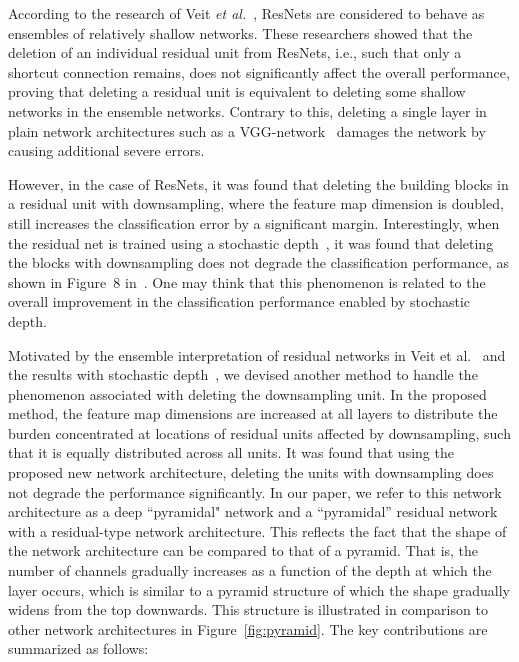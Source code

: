 \documentclass[10pt,twocolumn,letterpaper]{article}
\begin{document}
According to the research of Veit {\it et al.}~\cite{ensemble}, ResNets are considered to behave as ensembles of relatively shallow networks. These researchers showed that the deletion of an individual residual unit from ResNets, i.e., such that only a shortcut connection remains, does not significantly affect the overall performance, proving that deleting a residual unit is equivalent to deleting some shallow networks in the ensemble networks. Contrary to this, deleting a single layer in plain network architectures such as a VGG-network~\cite{VGG} damages the network by causing additional severe errors.

However, in the case of ResNets, it was found that deleting the building blocks in a residual unit with downsampling, where the feature map dimension is doubled, still increases the classification error by a significant margin. Interestingly, when the residual net is trained using a stochastic depth~\cite{stochasticdepth}, it was found that deleting the blocks with downsampling does not degrade the classification performance, as shown in Figure~8 in~\cite{ensemble}. One may think that this phenomenon is related to the overall improvement in the classification performance enabled by stochastic depth.


Motivated by the ensemble interpretation of residual networks in Veit et al.~\cite{ensemble} and the results with stochastic depth~\cite{stochasticdepth}, we devised another method to handle the phenomenon associated with deleting the downsampling unit. In the proposed method, the feature map dimensions are increased at all layers to distribute the burden concentrated at locations of residual units affected by downsampling, such that it is equally distributed across all units. It was found that using the proposed new network architecture, deleting the units with downsampling does not degrade the performance significantly.
In our paper, we refer to this network architecture as a deep ``pyramidal" network and a ``pyramidal'' residual network with a residual-type network architecture. This reflects the fact that the shape of the network architecture can be compared to that of a pyramid. That is, the number of channels gradually increases as a function of the depth at which the layer occurs, which is similar to a pyramid structure of which the shape gradually widens from the top downwards. This structure is illustrated in comparison to other network architectures in Figure~\ref{fig:pyramid}. The key contributions are summarized as follows:
\end{document}
